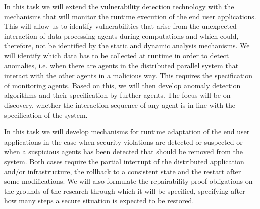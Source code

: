 \begin{Workpackage}{\thewpno}
\begin{Task}
\TaskResults{%
}
\TaskHeader{}
In this task we will extend the vulnerability detection technology with the mechanisms that will monitor the runtime execution of the end user applications. This will allow us to identify vulnerabilities that arise from the unexpected interaction of data processing agents during computations and which could, therefore, not be identified by the static and dynamic analysis mechanisms. We will identify which data has to be collected at runtime in order to detect anomalies, i.e. when there are agents in the distributed parallel system that interact with the other agents in a malicious way. This requires the specification of monitoring agents. Based on this, we will then develop anomaly detection algorithms and their specification by further agents. The focus will be on discovery, whether the interaction sequence of any agent is in line with the specification of the system.
\end{Task}

\begin{Task}
\TaskResults{%
}
\TaskHeader{}
\end{Task}

\begin{Task}
\TaskResults{%
}
\TaskHeader{}
In this task we will develop mechanisms for runtime adaptation of the end user applications in the case when security violations are detected or suspected or when a suspicious agents has been detected that should be removed from the system. Both cases require the partial interrupt of the distributed application and/or infrastructure, the rollback to a consistent state and the restart after some modifications. We will also formulate the repairability proof obligations on the grounds of the research through which it will be specified, specifying after how many steps a secure situation is expected to be restored.
\end{Task}



\end{Workpackage}
